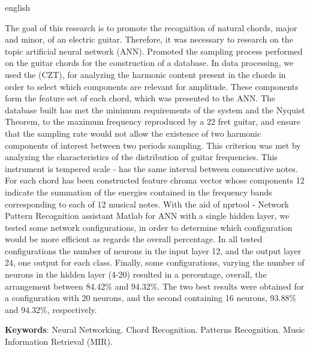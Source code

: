 \begin{resumo}[Abstract]
 \begin{otherlanguage*}{english}
 

The goal of this research is to promote the recognition of natural chords, major and minor, of an electric guitar. Therefore, it was necessary to research on the topic artificial neural network (ANN). Promoted the sampling process performed on the guitar chords for the construction of a database. In data processing, we used the (CZT), for analyzing the harmonic content present in the chords in order to select which components are relevant for amplitude. These components form the feature set of each chord, which was presented to the ANN. The database built has met the minimum requirements of the system and the Nyquist Theorem, to the maximum frequency reproduced by a 22 fret guitar, and ensure that the sampling rate would not allow the existence of two harmonic components of interest between two periods sampling. This criterion was met by analyzing the characteristics of the distribution of guitar frequencies. This instrument is tempered scale - has the same interval between consecutive notes. For each chord has been constructed feature chroma vector whose components 12 indicate the summation of the energies contained in the frequency bands corresponding to each of 12 musical notes. With the aid of nprtool - Network Pattern Recognition assistant Matlab for ANN with a single hidden layer, we tested some network configurations, in order to determine which configuration would be more efficient as regards the overall percentage. In all tested configurations the number of neurons in the input layer 12, and the output layer 24, one output for each class. Finally, some configurations, varying the number of neurons in the hidden layer (4-20) resulted in a percentage, overall, the arrangement between 84.42\% and 94.32\%. The two best results were obtained for a configuration with 20 neurons, and the second containing 16 neurons, 93.88\% and 94.32\%, respectively.
 
 
   \vspace{\onelineskip}
 
   \noindent 
   \textbf{Keywords}: Neural Networking. Chord Recognition. Patterns Recognition. Music Information Retrieval (MIR).
 \end{otherlanguage*}
\end{resumo}